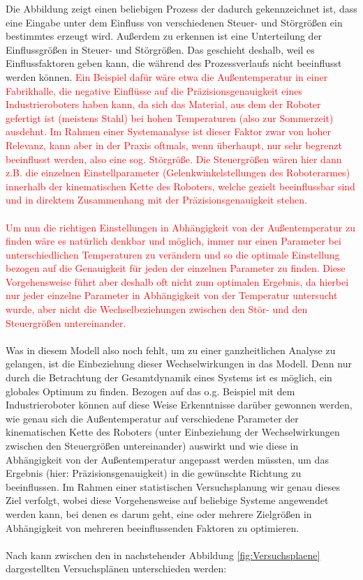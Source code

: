 \documentclass[
fontsize=10pt, 
listof = totoc,
parskip = half	
]{report}
\begin{document}
\noindent Die Abbildung zeigt einen beliebigen Prozess der dadurch gekennzeichnet ist, dass eine Eingabe unter dem Einfluss von verschiedenen Steuer- und Störgrößen ein bestimmtes erzeugt wird. Außerdem zu erkennen ist eine Unterteilung der Einflussgrößen in Steuer- und Störgrößen. Das geschieht deshalb, weil es Einflussfaktoren geben kann, die während des Prozessverlaufs nicht beeinflusst werden können. \textcolor{red}{Ein Beispiel dafür wäre etwa die Außentemperatur in einer Fabrikhalle, die negative Einflüsse auf die Präzisionsgenauigkeit eines Industrieroboters haben kann, da sich das Material, aus dem der Roboter gefertigt ist (meistens Stahl) bei hohen Temperaturen (also zur Sommerzeit) ausdehnt. Im Rahmen einer Systemanalyse ist dieser Faktor zwar von hoher Relevanz, kann aber in der Praxis oftmals, wenn überhaupt, nur sehr begrenzt beeinflusst werden, also eine sog. Störgröße. Die Steuergrößen wären hier dann z.B. die einzelnen Einstellparameter (Gelenkwinkelstellungen des Roboterarmes) innerhalb der kinematischen Kette des Roboters, welche gezielt beeinflussbar sind und in direktem Zusammenhang mit der Präzisionsgenauigkeit stehen.
\\\\
Um nun die richtigen Einstellungen in Abhängigkeit von der Außentemperatur zu finden wäre es natürlich denkbar und möglich, immer nur einen Parameter bei unterschiedlichen Temperaturen zu verändern und so die optimale Einstellung bezogen auf die Genauigkeit für jeden der einzelnen Parameter zu finden. Diese Vorgehensweise führt aber deshalb oft nicht zum optimalen Ergebnis, da hierbei nur jeder einzelne Parameter in Abhängigkeit von der Temperatur untersucht wurde, aber nicht die Wechselbeziehungen zwischen den Stör- und den Steuergrößen untereinander.}
\\\\
\noindent Was in diesem Modell also noch fehlt, um zu einer ganzheitlichen Analyse zu gelangen, ist die Einbeziehung dieser Wechselwirkungen  in das Modell. Denn nur durch die Betrachtung der Gesamtdynamik eines Systems ist es möglich, ein globales Optimum zu finden. Bezogen auf das o.g. Beispiel mit dem Industrieroboter können auf diese Weise Erkenntnisse darüber gewonnen werden, wie genau sich die Außentemperatur auf verschiedene Parameter der kinematischen Kette des Roboters (unter Einbeziehung der Wechselwirkungen zwischen den Steuergrößen untereinander) auswirkt und wie diese in Abhängigkeit von der Außentemperatur angepasst werden müssten, um das Ergebnis (hier: Präzisionsgenauigkeit) in die gewünschte Richtung zu beeinflussen. Im Rahmen einer statistischen Versuchsplanung wir genau dieses Ziel verfolgt, wobei diese Vorgehensweise auf beliebige Systeme angewendet werden kann, bei denen es darum geht, eine oder mehrere Zielgrößen in Abhängigkeit von mehreren beeinflussenden Faktoren zu optimieren.
\\\\
Nach \cite{schiefer_2018} kann zwischen den in nachstehender Abbildung \ref{fig:Versuchsplaene} dargestellten Versuchsplänen unterschieden werden:
\end{document}
